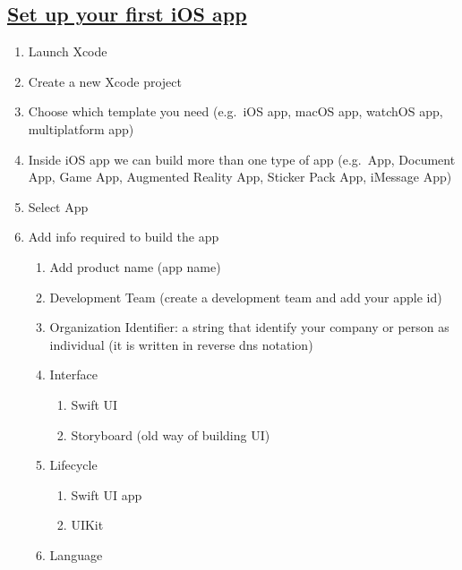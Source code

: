 \documentclass[]{article}
\providecommand{\tightlist}{%
  \setlength{\itemsep}{0pt}\setlength{\parskip}{0pt}}
\begin{document}
\hypertarget{set-up-your-first-ios-app}{%
\subsection{\texorpdfstring{\href{https://www.youtube.com/watch?v=bqu6BquVi2M}{Set
up your first iOS
app}}{Set up your first iOS app}}\label{set-up-your-first-ios-app}}

\begin{enumerate}
\def\labelenumi{\arabic{enumi}.}
\tightlist
\item
  Launch Xcode
\item
  Create a new Xcode project
\item
  Choose which template you need (e.g.~iOS app, macOS app, watchOS app,
  multiplatform app)
\item
  Inside iOS app we can build more than one type of app (e.g.~App,
  Document App, Game App, Augmented Reality App, Sticker Pack App,
  iMessage App)
\item
  Select App
\item
  Add info required to build the app

  \begin{enumerate}
  \def\labelenumii{\arabic{enumii}.}
  \tightlist
  \item
    Add product name (app name)
  \item
    Development Team (create a development team and add your apple id)
  \item
    Organization Identifier: a string that identify your company or
    person as individual (it is written in reverse dns notation)
  \item
    Interface

    \begin{enumerate}
    \def\labelenumiii{\arabic{enumiii}.}
    \tightlist
    \item
      Swift UI
    \item
      Storyboard (old way of building UI)
    \end{enumerate}
  \item
    Lifecycle

    \begin{enumerate}
    \def\labelenumiii{\arabic{enumiii}.}
    \tightlist
    \item
      Swift UI app
    \item
      UIKit
    \end{enumerate}
  \item
    Language


\end{enumerate}
\end{enumerate}
\end{document}
